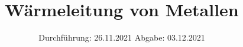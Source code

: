 

\subject{VERSUCH 204}
\title{Wärmeleitung von Metallen}
\date{%
  Durchführung: 26.11.2021
  \hspace{3em}
  Abgabe: 03.12.2021
}



\maketitle
\thispagestyle{empty}
\tableofcontents
\newpage






\printbibliography{}



